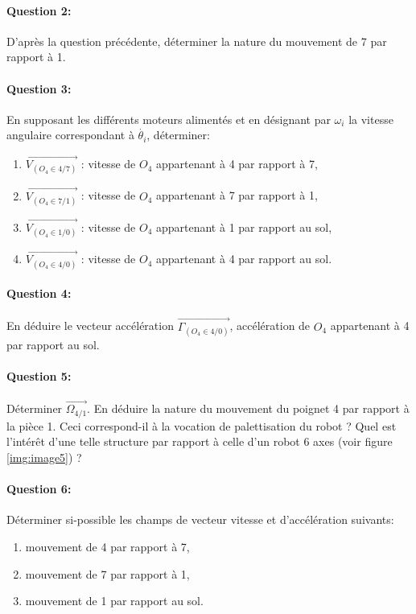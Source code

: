 \paragraph{Question 2:} D'après la question précédente, déterminer la nature du mouvement de 7 par rapport à 1.

\paragraph{Question 3:} En supposant les différents moteurs alimentés et en désignant par $\omega_{i}$ la vitesse angulaire correspondant à $\dot{\theta_i}$, déterminer:
\begin{enumerate}
 \item $\overrightarrow{V_{(O_4\in4/7)}}$ : vitesse de $O_4$ appartenant à 4 par rapport à 7,
 \item $\overrightarrow{V_{(O_4\in7/1)}}$ : vitesse de $O_4$ appartenant à 7 par rapport à 1,
 \item $\overrightarrow{V_{(O_4\in1/0)}}$ : vitesse de $O_4$ appartenant à 1 par rapport au sol,
 \item $\overrightarrow{V_{(O_4\in4/0)}}$ : vitesse de $O_4$ appartenant à 4 par rapport au sol.
\end{enumerate}

\paragraph{Question 4:} En déduire le vecteur accélération $\overrightarrow{\Gamma_{(O_4\in4/0)}}$, accélération de $O_4$ appartenant à 4 par rapport au sol.

\paragraph{Question 5:} Déterminer $\overrightarrow{\Omega_{4/1}}$. En déduire la nature du mouvement du poignet 4 par rapport à la pièce 1.
Ceci correspond-il à la vocation de palettisation du robot ? Quel est l'intérêt d'une telle structure par rapport à celle d'un robot 6 axes (voir figure \ref{img:image5}) ?

\paragraph{Question 6:} Déterminer si-possible les champs de vecteur vitesse et d'accélération suivants:
\begin{enumerate}
 \item mouvement de 4 par rapport à 7,
 \item mouvement de 7 par rapport à 1,
 \item mouvement de 1 par rapport au sol.
\end{enumerate}

